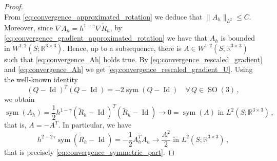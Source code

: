 \documentclass{article}
\theoremstyle{plain}
\theoremstyle{plain}
\theoremstyle{plain}
\theoremstyle{plain}
\theoremstyle{plain}
\theoremstyle{definition}
\theoremstyle{definition}
\renewcommand{\r}{\mathbb{R}}
\DeclareMathOperator{\Id}{Id}
\DeclareMathOperator{\SO}{SO}
\DeclareMathOperator{\sym}{sym}
\begin{document}
\begin{proof}
\begin{equation}
    \end{equation}
    From \eqref{eq:convergence_approximated_rotation} we deduce that $\|A_h\|_{L^2} \leq C$. Moreover, since $\nabla A_h = h^{1-\gamma} \nabla \tilde R_h$, by \eqref{eq:convergence_gradient_approximated_rotation} we have that $A_h$ is bounded in $W^{1,2}(S; \r^{3 \times 3})$. Hence, up to a subsequence, there is $A \in W^{1,2}(S; \r^{3 \times 3})$ such that \eqref{eq:convergence_Ah} holds true. By \eqref{eq:convergence_rescaled_gradient} and \eqref{eq:convergence_Ah} we get \eqref{eq:convergence_rescaled_gradient_U}. Using the well-known identity
    \begin{equation}
        {(Q - \Id)}^T(Q - \Id) = -2\sym(Q - \Id) \quad \forall \, Q \in \SO(3) \,,
    \end{equation}
    we obtain
    \begin{equation}
        \sym(A_h) = \dfrac{1}{2}h^{1-\gamma}{(\tilde R_h - \Id)}^T(\tilde R_h - \Id) \to 0 = \sym(A) \, \, \text{in} \, \, L^2(S; \r^{3 \times 3}) \,,
    \end{equation}
    that is, $A = - A^T$. In particular, we have
    \begin{equation}
        h^{2-2\gamma} \sym(\tilde R_h - \Id) = - \dfrac{1}{2}A_h^T A_h \to \dfrac{A^2}{2} \, \, \text{in} \, \, L^2(S; \r^{3 \times 3}) \,,
    \end{equation}
    that is precisely \eqref{eq:convergence_symmetric_part}. 
    

\end{proof}
\end{document}
